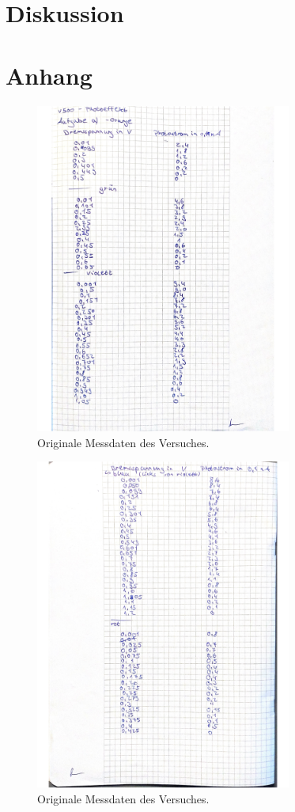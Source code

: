 \section{Diskussion}
\label{sec:Diskussion}


\section{Anhang}
\label{sec:Anhang}

\begin{figure}[H]
    \centering
    \includegraphics[width=0.75\textwidth]{data/origDaten1.jpg}
    \caption{Originale Messdaten des Versuches.}
    \label{fig:origData1}
\end{figure}
\begin{figure}[H]
    \centering
    \includegraphics[width=0.75\textwidth]{data/origDaten2.jpg}
    \caption{Originale Messdaten des Versuches.}
    \label{fig:origData2}
\end{figure}
